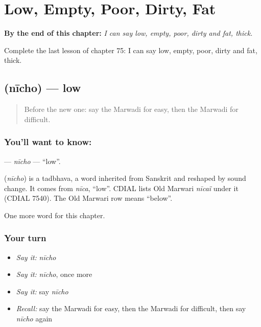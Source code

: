 
\chapter{Low, Empty, Poor, Dirty, Fat}
\label{ch:mw-low-empty-poor-dirty-fat}

\begin{chapteropening}
\textbf{By the end of this chapter:} \emph{I can say low, empty, poor, dirty and fat, thick.}

Complete the last lesson of chapter 75: I can say low, empty, poor, dirty and fat, thick.
\end{chapteropening}

\section[\texorpdfstring{\mw{नीचो} (nīcho)}{नीचो (nīcho)}]{ (nīcho) — low}

\label{lesson:MW-C75-nicho}



\begin{quote}
Before the new one: say the Marwadi for easy, then the Marwadi for difficult.
\end{quote}

\subsection*{You'll want to know: }
\textbf{} — \emph{nīcho} — \textquotedblleft{}low\textquotedblright{}.

\begin{cousinweb}
\textbf{} (\emph{nīcho}) is a tadbhava, a word inherited from Sanskrit and reshaped by sound change. It comes from \emph{nīca}, \textquotedblleft{}low\textquotedblright{}. CDIAL lists Old Marwari \emph{nīcaï} under it (CDIAL 7540). The Old Marwari row means \textquotedblleft{}below\textquotedblright{}.
\end{cousinweb}

\begin{grammarlens}[title={What you've built}]
One more word for this chapter.
\end{grammarlens}

\subsection*{Your turn}
\begin{itemize}
\raggedright
  \item \emph{Say it:} \emph{nīcho}
  \item \emph{Say it:} \emph{nīcho}, once more
  \item \emph{Say it:} say \emph{nīcho}
  \item \emph{Recall:} say the Marwadi for easy, then the Marwadi for difficult, then say \emph{nīcho} again
\end{itemize}

